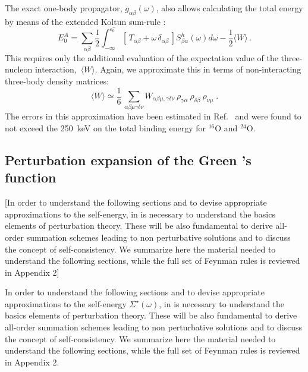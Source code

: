 The exact one-body propagator, $g_{\alpha\beta}(\omega)$, also allows calculating the total energy by means of the extended Koltun sum-rule \cite{Carbone2013Nov}: 
\begin{equation}
  \label{eq:Koltun_hW}
  E^A_0 = \sum_{\alpha\beta} \frac{1}{2} 
            \int_{-\infty}^{\varepsilon^-_0}  [\,T_{\alpha\beta}+\omega\,\delta_{\alpha\beta}\, ]
            S^h_{\beta\alpha}(\omega) d\omega
            -  \frac{1}{2} \langle W\rangle \, .
\end{equation}
This requires only the additional evaluation of the expectation value of the three-nucleon interaction,~$\langle W \rangle$. Again, we approximate this in terms of non-interacting three-body density matrices:
\begin{equation}
   \label{eq:Wddd}
    \langle W\rangle\simeq\frac{1}{6} \, \sum_{\alpha\beta\mu\gamma\delta\nu} W_{\alpha\beta\mu,\gamma\delta\nu}~\rho_{\gamma\alpha}~\rho_{\delta\beta}~\rho_{\nu\mu} \; .
\end{equation}
%
The errors in this approximation have been estimated in Ref.~\cite{Cipollone2013prl} and were found to not exceed the 250~keV on the total binding energy for $^{16}$O and $^{24}$O.

\subsection{Perturbation expansion of the Green 's function}
\label{sec:pertexp}

{\color{blue}
[In order to understand the following sections and to devise appropriate approximations to the self-energy, in is necessary to understand the basics elements of perturbation theory. These will be also fundamental to derive all-order summation schemes leading to non perturbative solutions and to discuss the concept of self-consistency.
We summarize here the material needed to understand the following sections, while the full set of Feynman rules is reviewed in Appendix 2]
}

In order to understand the following sections and to devise appropriate approximations to the self-energy $\Sigma^{\star}(\omega)$, in is necessary to understand the basics elements of perturbation theory.  These will be also fundamental to derive all-order summation schemes leading to non perturbative solutions and to discuss the concept of self-consistency. We summarize here the material needed to understand the following sections, while the full set of Feynman rules is reviewed in  Appendix 2.

